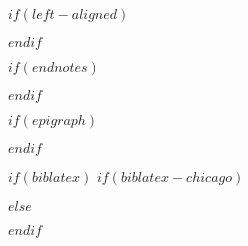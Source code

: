 
\usepackage{etoolbox}


$if(left-aligned)$
\usepackage[document]{ragged2e}
\setlength{\RaggedRightParindent}{\parindent}
\setlength{\RaggedRightRightskip}{0pt plus 3em}

$endif$

$if(endnotes)$
\usepackage{endnotes}
\renewcommand{\enotesize}{\normalsize}
\let\footnote=\endnote
$endif$


\usepackage{fancyhdr}
\setlength{\headheight}{0.25in}
\renewcommand{\headrulewidth}{0pt}  %
\renewcommand{\footrulewidth}{0pt}



\pagestyle{normal}


$if(epigraph)$
\usepackage{epigraph}
\renewcommand{\epigraphsize}{\footnotesize}
\setlength{\epigraphrule}{0em}
\setlength{\beforeepigraphskip}{0em}
\setlength{\afterepigraphskip}{1em}
$endif$

$if(biblatex)$
$if(biblatex-chicago)$
\usepackage[$if(biblio-style)$$biblio-style$,$endif$$for(biblatexoptions)$$biblatexoptions$$sep$,$endfor$]{biblatex-chicago}
$else$
\usepackage[$if(biblio-style)$style=$biblio-style$,$endif$$for(biblatexoptions)$$biblatexoptions$$sep$,$endfor$]{biblatex}
$endif$


